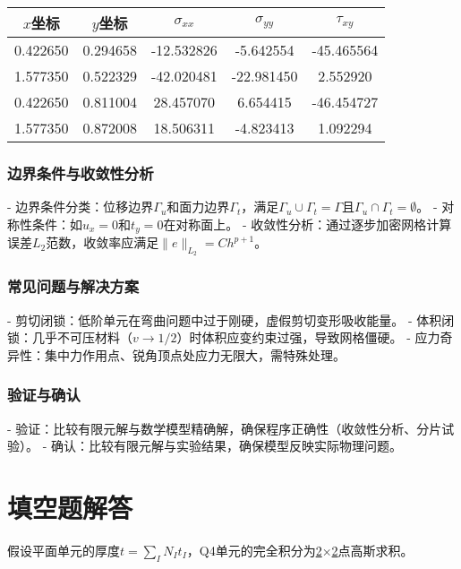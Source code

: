\documentclass{article}
\begin{document}
\begin{center}
\begin{tabular}{|c|c|c|c|c|}
\hline
$x$坐标 & $y$坐标 & $\sigma_{xx}$ & $\sigma_{yy}$ & $\tau_{xy}$ \\
\hline
0.422650 & 0.294658 & -12.532826 & -5.642554 & -45.465564 \\
\hline
1.577350 & 0.522329 & -42.020481 & -22.981450 & 2.552920 \\
\hline
0.422650 & 0.811004 & 28.457070 & 6.654415 & -46.454727 \\
\hline
1.577350 & 0.872008 & 18.506311 & -4.823413 & 1.092294 \\
\hline
\end{tabular}
\end{center}

\subsubsection{边界条件与收敛性分析}
- 边界条件分类：位移边界$\Gamma_{u}$和面力边界$\Gamma_{t}$，满足$\Gamma_{u} \cup \Gamma_{t} = \Gamma$且$\Gamma_{u} \cap \Gamma_{t} = \emptyset$。
- 对称性条件：如$u_{x}=0$和$t_{y}=0$在对称面上。
- 收敛性分析：通过逐步加密网格计算误差$L_{2}$范数，收敛率应满足$\|e\|_{L_{2}} = C h^{p+1}$。

\subsubsection{常见问题与解决方案}
- 剪切闭锁：低阶单元在弯曲问题中过于刚硬，虚假剪切变形吸收能量。
- 体积闭锁：几乎不可压材料（$v \to 1/2$）时体积应变约束过强，导致网格僵硬。
- 应力奇异性：集中力作用点、锐角顶点处应力无限大，需特殊处理。

\subsubsection{验证与确认}
- 验证：比较有限元解与数学模型精确解，确保程序正确性（收敛性分析、分片试验）。
- 确认：比较有限元解与实验结果，确保模型反映实际物理问题。

\section{填空题解答}
假设平面单元的厚度$t = \sum_{I} N_{I} t_{I}$，Q4单元的完全积分为\underline{2}×\underline{2}点高斯求积。
\end{document}
